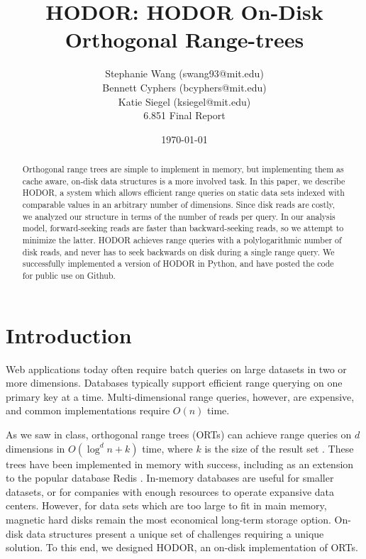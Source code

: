 \documentclass[11pt, oneside]{article}
\title{HODOR: HODOR On-Disk Orthogonal Range-trees}
\author{Stephanie Wang (swang93@mit.edu)\\
Bennett Cyphers (bcyphers@mit.edu)\\
Katie Siegel (ksiegel@mit.edu)\\[2ex]
6.851 Final Report}
\date{\today}
\begin{document}
\maketitle

\vfill

\begin{abstract}

    Orthogonal range trees are simple to implement in memory, but implementing
    them as cache aware, on-disk data structures is a more involved task. In this
    paper, we describe HODOR, a system which allows efficient range queries on
    static data sets indexed with comparable values in an arbitrary number of
    dimensions. Since disk reads are costly, we analyzed our structure in terms
    of the number of reads per query. In our analysis model, forward-seeking
    reads are faster than backward-seeking reads, so we attempt to minimize the
    latter. HODOR achieves range queries with a polylogarithmic number of disk
    reads, and never has to seek backwards on disk during a single range query.
    We successfully implemented a version of HODOR in Python, and have posted
    the code for public use on Github.

\end{abstract}

\clearpage

\section{Introduction}

Web applications today often require batch queries on large datasets in two or
more dimensions. Databases typically support efficient range querying on one
primary key at a time. Multi-dimensional range queries, however, are expensive,
and common implementations require $O(n)$ time. 

As we saw in class, orthogonal range trees (ORTs) can achieve range queries on
$d$ dimensions in $O(\log^{d} n + k)$ time, where $k$ is the size of the result
set \cite{lecture}. These trees have been implemented in memory with success,
including as an extension to the popular database Redis \cite{redis}. In-memory
databases are useful for smaller datasets, or for companies with enough
resources to operate expansive data centers. However, for data sets which are
too large to fit in main memory, magnetic hard disks remain the most economical
long-term storage option. On-disk data structures present a unique set of
challenges requiring a unique solution. To this end, we designed HODOR, an
on-disk implementation of ORTs. 
\end{document}
